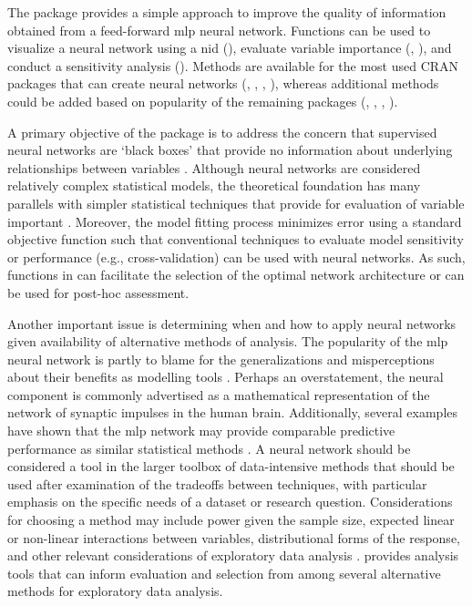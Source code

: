 \documentclass[article,shortnames]{jss}
\begin{document}
The  package provides a simple approach to improve the quality of information obtained from a feed-forward \ac{mlp} neural network.  Functions can be used to visualize a neural network using a \acl{nid} (), evaluate variable importance (, ), and conduct a sensitivity analysis ().  Methods are available for the most used \ac{CRAN} packages that can create neural networks (, , , ), whereas additional methods could be added based on popularity of the remaining packages (, , , ).  

A primary objective of the package is to address the concern that supervised neural networks are `black boxes' that provide no information about underlying relationships between variables \citep{Paruelo97,Olden02}.  Although neural networks are considered relatively complex statistical models, the theoretical foundation has many parallels with simpler statistical techniques that provide for evaluation of variable important \citep{Cheng94}.  Moreover, the model fitting process minimizes error using a standard objective function such that conventional techniques to evaluate model sensitivity or performance (e.g., cross-validation) can be used with neural networks.  As such, functions in  can facilitate the selection of the optimal network architecture or can be used for post-hoc assessment. 

Another important issue is determining when and how to apply neural networks given availability of alternative methods of analysis.  The popularity of the \ac{mlp} neural network is partly to blame  for the generalizations and misperceptions about their benefits as modelling tools \citep{Burke97}. Perhaps an overstatement, the neural component is commonly advertised as a mathematical representation of the network of synaptic impulses in the human brain.  Additionally, several examples have shown that the \ac{mlp} network may provide comparable predictive performance as similar statistical methods \citep{Feng02,Razi05,Beck14a}.  A neural network should be considered a tool in the larger toolbox of data-intensive methods that should be used after examination of the tradeoffs between techniques, with particular emphasis on the specific needs of a dataset or research question.  Considerations for choosing a method may include power given the sample size, expected linear or non-linear interactions between variables, distributional forms of the response, and other relevant considerations of exploratory data analysis \citep{Zuur10}.   provides analysis tools that can inform evaluation and selection from among several alternative methods for exploratory data analysis.
\end{document}
